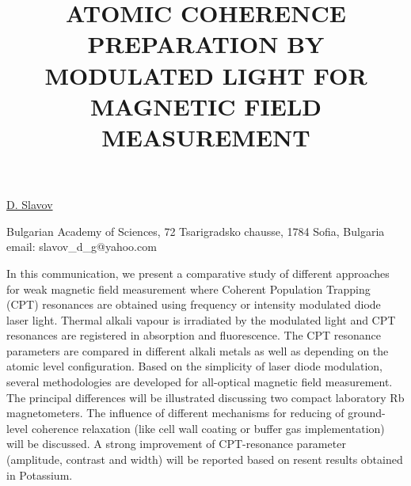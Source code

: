\title{ATOMIC COHERENCE PREPARATION BY MODULATED LIGHT FOR MAGNETIC FIELD MEASUREMENT}

\underline{D. Slavov}


Bulgarian Academy of Sciences,
72 Tsarigradsko chausse,
1784 Sofia, Bulgaria\\
email: slavov\_d\_g@yahoo.com

In this communication, we present a comparative study of different approaches for weak magnetic field measurement where Coherent Population Trapping (CPT) resonances are obtained using frequency or intensity modulated diode laser light. Thermal alkali vapour is irradiated by the modulated light and CPT resonances are registered in absorption and fluorescence. The CPT resonance parameters are compared in different alkali metals as well as depending on the atomic level configuration.
Based on the simplicity of laser diode modulation, several methodologies are developed for all-optical magnetic field measurement. The principal differences will be illustrated discussing two compact laboratory Rb magnetometers.
The influence of different mechanisms for reducing of ground-level coherence relaxation (like cell wall coating or buffer gas implementation) will be discussed. A strong improvement of CPT-resonance parameter (amplitude, contrast and width) will be reported based on resent results obtained in Potassium.

\vspace{\baselineskip}